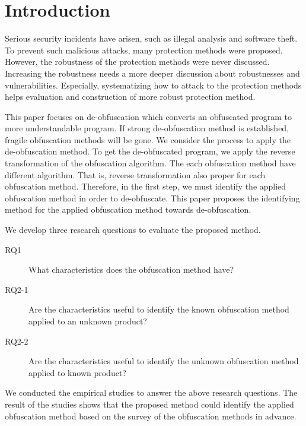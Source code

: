 \documentclass[conference]{IEEEtran}
\begin{document}

%
\IEEEpeerreviewmaketitle

\section{Introduction}\label{sect:introduction}

Serious security incidents have arisen, such as illegal analysis and
software theft.  To prevent such malicious attacks, many protection
methods were proposed.  However, the robustness of the protection
methods were never discussed.  Increasing the robustness needs a more
deeper discussion about robustnesses and vulnerabilities.  Especially,
systematizing how to attack to the protection methods helps evaluation
and construction of more robust protection method.

This paper focuses on de-obfuscation which converts an obfuscated program
to more understandable program.  If strong de-obfuscation method is
established, fragile obfuscation methods will be gone.
%
We consider the process to apply the de-obfuscation method.
%
To get the de-obfuscated program, we apply the reverse transformation
of the obfuscation algorithm.  The each obfuscation method have
different algorithm.  That is, reverse transformation also proper for
each obfuscation method.  Therefore, in the first step, we must
identify the applied obfuscation method in order to de-obfuscate.
This paper proposes the identifying method for the applied obfuscation
method towards de-obfuscation.

We develop three research questions to evaluate the proposed method.
\begin{description}
\item[RQ1]   What characteristics does the obfuscation method have?
\item[RQ2-1] Are the characteristics useful to identify the known
  obfuscation method applied to an unknown product?
\item[RQ2-2] Are the characteristics useful to identify the unknown
  obfuscation method applied to known product?
\end{description}
We conducted the empirical studies to answer the above research
questions.  The result of the studies shows that the proposed method
could identify the applied obfuscation method based on the survey of
the obfuscation methods in advance.
\end{document}
